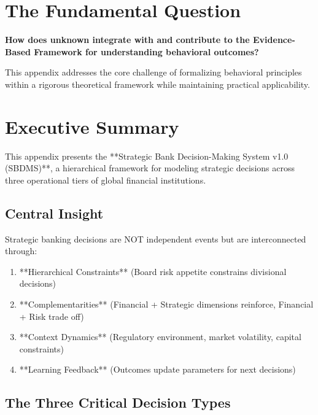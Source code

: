 \documentclass[11pt]{article}
\begin{document}
\section{The Fundamental Question}
\label{sec:bnk-fundamental}

\begin{tcolorbox}[
    colback=red!5!white,
    colframe=red!75!black,
    title={\textbf{Fundamental Question}}
]
\textbf{How does unknown integrate with and contribute to the
Evidence-Based Framework for understanding behavioral outcomes?}

This appendix addresses the core challenge of formalizing behavioral principles
within a rigorous theoretical framework while maintaining practical applicability.
\end{tcolorbox}


\section{Executive Summary}

This appendix presents the **Strategic Bank Decision-Making System v1.0 (SBDMS)**, a hierarchical framework for modeling strategic decisions across three operational tiers of global financial institutions.

\subsection{Central Insight}

Strategic banking decisions are NOT independent events but are interconnected through:
\begin{enumerate}
\item **Hierarchical Constraints** (Board risk appetite constrains divisional decisions)
\item **Complementarities** (Financial + Strategic dimensions reinforce, Financial + Risk trade off)
\item **Context Dynamics** (Regulatory environment, market volatility, capital constraints)
\item **Learning Feedback** (Outcomes update parameters for next decisions)
\end{enumerate}

\subsection{The Three Critical Decision Types}
\end{document}
